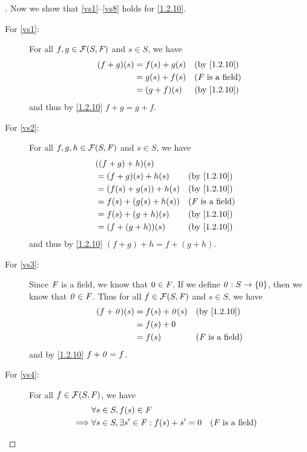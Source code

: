 \begin{proof}[]
	Now we show that \ref{vs1}--\ref{vs8} holds for \cref{1.2.10}.
	\begin{description}
		\item[For \ref{vs1}:]
			For all \(f, g \in \FS\) and \(s \in S\), we have
			\begin{align*}
				(f + g)(s) & = f(s) + g(s) &  & \text{(by \cref{1.2.10})}  \\
				           & = g(s) + f(s) &  & \text{(\(\F\) is a field)} \\
				           & = (g + f)(s)  &  & \text{(by \cref{1.2.10})}
			\end{align*}
			and thus by \cref{1.2.10} \(f + g = g + f\).
		\item[For \ref{vs2}:]
			For all \(f, g, h \in \FS\) and \(s \in S\), we have
			\begin{align*}
				 & ((f + g) + h)(s)                                       \\
				 & = (f + g)(s) + h(s)    &  & \text{(by \cref{1.2.10})}  \\
				 & = (f(s) + g(s)) + h(s) &  & \text{(by \cref{1.2.10})}  \\
				 & = f(s) + (g(s) + h(s)) &  & \text{(\(\F\) is a field)} \\
				 & = f(s) + (g + h)(s)    &  & \text{(by \cref{1.2.10})}  \\
				 & = (f + (g + h))(s)     &  & \text{(by \cref{1.2.10})}
			\end{align*}
			and thus by \cref{1.2.10} \((f + g) + h = f + (g + h)\).
		\item[For \ref{vs3}:]
			Since \(\mathit{F}\) is a field, we know that \(0 \in \mathit{F}\).
			If we define \(\mathit{0} : S \to \{0\}\), then we know that \(\mathit{0} \in \mathit{F}\).
			Thus for all \(f \in \FS\) and \(s \in S\), we have
			\begin{align*}
				(f + \zv)(s) & = f(s) + \zv(s) &  & \text{(by \cref{1.2.10})}  \\
				             & = f(s) + 0                                      \\
				             & = f(s)          &  & \text{(\(\F\) is a field)}
			\end{align*}
			and by \cref{1.2.10} \(f + \mathit{0} = f\).
		\item[For \ref{vs4}:]
			For all \(f \in \FS\), we have
			\begin{align*}
				         & \forall s \in S, f(s) \in \F                                                          \\
				\implies & \forall s \in S, \exists s' \in \F : f(s) + s' = 0 &  & \text{(\(\F\) is a field)}    \\

\end{align*}
\end{description}
\end{proof}
